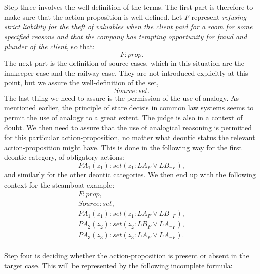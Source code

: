 		Step three involves the well-definition of the terms. The first part is therefore to make sure that the action-proposition is well-defined. Let $F$ represent \textit{refusing strict liability for the theft of valuables when the client paid for a room for some specified reasons and that the company has tempting opportunity for fraud and plunder of the client}, so that:
			\[
				F : prop.
			\]
		The next part is the definition of source cases, which in this situation are the innkeeper case and the railway case. They are not introduced explicitly at this point, but we assure the well-definition of the set,
			\[
				Source : set.
			\]
		The last thing we need to assure is the permission of the use of analogy. As mentioned earlier, the principle of stare decisis in common law systems seems to permit the use of analogy to a great extent. The judge is also in a context of doubt. We then need to assure that the use of analogical reasoning is permitted for this particular action-proposition, no matter what deontic status the relevant action-proposition might have. This is done in the following way for the first deontic category, of obligatory actions:
			\[
				PA_1(z_1) : set (z_1 : LA_F \lor LB_{\neg F}),
			\]
		and similarly for the other deontic categories. We then end up with the following context for the steamboat example:
			\[
			\begin{array}{c}
				F : prop,                                                                                                       \\
				Source : set,                                                                                                   \\
				PA_1(z_1) : set (z_1 : LA_F \lor LB_{\neg F}),                                                                  \\
				PA_2(z_2) : set (z_2 : LB_F \lor LA_{\neg F}),                                                                  \\
				PA_3(z_3) : set (z_3 : LA_F \lor LA_{\neg F}).                                          							\\
			\end{array}
			\]
				
		Step four is deciding whether the action-proposition is present or absent in the target case. This will be represented by the following incomplete formula: \newline\medskip
			
